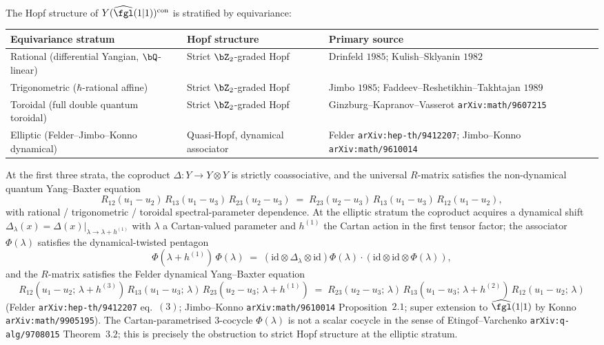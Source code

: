 \begin{proposition}
\label{prop:conifold-hopf-stratification}
The Hopf structure of $Y(\widehat{\fgl}(1|1))^{\mathrm{con}}$ is stratified
by equivariance:
\begin{center}
\renewcommand{\arraystretch}{1.2}
\begin{tabular}{lll}
\toprule
\textbf{Equivariance stratum} & \textbf{Hopf structure} & \textbf{Primary source} \\
\midrule
Rational (differential Yangian, $\bQ$-linear) & Strict $\bZ_2$-graded Hopf
 & Drinfeld $1985$; Kulish--Sklyanin $1982$ \\
Trigonometric ($\hbar$-rational affine) & Strict $\bZ_2$-graded Hopf
 & Jimbo $1985$; Faddeev--Reshetikhin--Takhtajan $1989$ \\
Toroidal (full double quantum toroidal) & Strict $\bZ_2$-graded Hopf
 & Ginzburg--Kapranov--Vasserot \texttt{arXiv:math/9607215} \\
Elliptic (Felder--Jimbo--Konno dynamical) & Quasi-Hopf, dynamical associator
 & Felder \texttt{arXiv:hep-th/9412207}; Jimbo--Konno \texttt{arXiv:math/9610014} \\
\bottomrule
\end{tabular}
\end{center}
At the first three strata, the coproduct $\Delta : Y \to Y \otimes Y$
is strictly coassociative, and the universal $R$-matrix satisfies the
non-dynamical quantum Yang--Baxter equation
\[
 R_{12}(u_1 - u_2)\, R_{13}(u_1 - u_3)\, R_{23}(u_2 - u_3)
 \;=\; R_{23}(u_2 - u_3)\, R_{13}(u_1 - u_3)\, R_{12}(u_1 - u_2),
\]
with rational / trigonometric / toroidal spectral-parameter dependence.
At the elliptic stratum the coproduct acquires a dynamical shift
$\Delta_\lambda(x) = \Delta(x)\big|_{\lambda \to \lambda + h^{(1)}}$
with $\lambda$ a Cartan-valued parameter and $h^{(1)}$ the Cartan
action in the first tensor factor; the associator $\Phi(\lambda)$
satisfies the dynamical-twisted pentagon
\[
 \Phi(\lambda + h^{(1)})\,\Phi(\lambda)
 \;=\; (\mathrm{id} \otimes \Delta_\lambda \otimes \mathrm{id})\Phi(\lambda)
 \cdot (\mathrm{id} \otimes \mathrm{id} \otimes \Phi(\lambda)),
\]
and the $R$-matrix satisfies the Felder dynamical Yang--Baxter equation
\[
 R_{12}(u_1 - u_2;\, \lambda + h^{(3)})\,
 R_{13}(u_1 - u_3;\, \lambda)\,
 R_{23}(u_2 - u_3;\, \lambda + h^{(1)})
 \;=\; R_{23}(u_2 - u_3;\, \lambda)\,
 R_{13}(u_1 - u_3;\, \lambda + h^{(2)})\,
 R_{12}(u_1 - u_2;\, \lambda)
\]
\textup{(}Felder \texttt{arXiv:hep-th/9412207} eq.~$(3)$;
Jimbo--Konno \texttt{arXiv:math/9610014} Proposition~$2.1$; super
extension to $\widehat{\fgl}(1|1)$ by Konno
\texttt{arXiv:math/9905195}\textup{).} The Cartan-parametrised
$3$-cocycle $\Phi(\lambda)$ is not a scalar cocycle in the sense of
Etingof--Varchenko \texttt{arXiv:q-alg/9708015} Theorem~$3.2$; this
is precisely the obstruction to strict Hopf structure at the elliptic
stratum.
\end{proposition}

